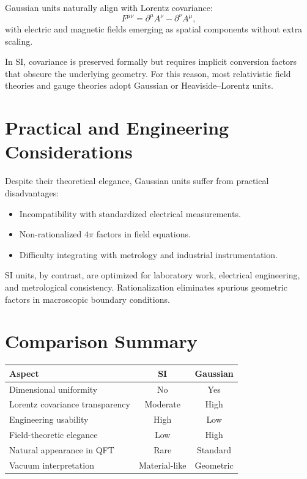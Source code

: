 \documentclass[12pt]{article}
\begin{document}
Gaussian units naturally align with Lorentz covariance:
\[
F^{\mu\nu} = \partial^\mu A^\nu - \partial^\nu A^\mu,
\]
with electric and magnetic fields emerging as spatial components without extra scaling.

In SI, covariance is preserved formally but requires implicit conversion factors that obscure the underlying geometry. For this reason, most relativistic field theories and gauge theories adopt Gaussian or Heaviside–Lorentz units.

\section{Practical and Engineering Considerations}

Despite their theoretical elegance, Gaussian units suffer from practical disadvantages:
\begin{itemize}
\item Incompatibility with standardized electrical measurements.
\item Non-rationalized $4\pi$ factors in field equations.
\item Difficulty integrating with metrology and industrial instrumentation.
\end{itemize}

SI units, by contrast, are optimized for laboratory work, electrical engineering, and metrological consistency. Rationalization eliminates spurious geometric factors in macroscopic boundary conditions.

\section{Comparison Summary}

\begin{center}
\begin{tabular}{lcc}
\hline
Aspect & SI & Gaussian \\
\hline
Dimensional uniformity & No & Yes \\
Lorentz covariance transparency & Moderate & High \\
Engineering usability & High & Low \\
Field-theoretic elegance & Low & High \\
Natural appearance in QFT & Rare & Standard \\
Vacuum interpretation & Material-like & Geometric \\
\hline
\end{tabular}
\end{center}
\end{document}
